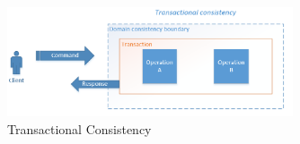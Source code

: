 \begin{figure}[h]
  \caption{Transactional Consistency} \label{fig:transactional-consistency}
  \centering
  \includegraphics[width=0.75\textwidth]{img/transactional-consistency}
\end{figure}
